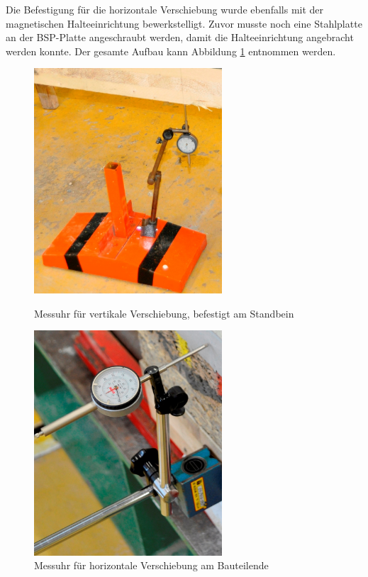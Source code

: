 Die Befestigung für die horizontale Verschiebung wurde ebenfalls mit der magnetischen Halteeinrichtung bewerkstelligt. Zuvor musste noch eine Stahlplatte an der BSP-Platte angeschraubt werden, damit die Halteeinrichtung angebracht werden konnte. Der gesamte Aufbau kann Abbildung \ref{messuhr_seitlich} entnommen werden.

\begin{figure}
\begin{minipage}[h]{7cm}
	\includegraphics[width=7cm]{Versuchsaufbau/messuhr_unten.jpg}
	\caption{Messuhr für vertikale Verschiebung, befestigt am Standbein}
	\label{messuhr_unten}
\end{minipage}
\hfill
\begin{minipage}[h]{7cm}
	\includegraphics[width=7cm]{Versuchsaufbau/messuhr_seitlich.jpg}
	\caption{Messuhr für horizontale Verschiebung am Bauteilende}
	\label{messuhr_seitlich}
\end{minipage}
\end{figure}


